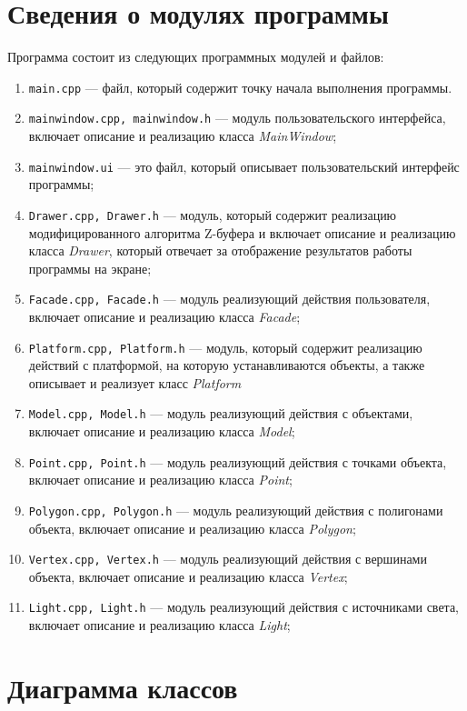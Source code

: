 \section{Сведения о модулях программы}
Программа состоит из следующих программных модулей и файлов:
\begin{enumerate}
	\item \texttt{main.cpp} --- файл, который содержит точку начала выполнения программы.
	\item \texttt{mainwindow.cpp, mainwindow.h} --- модуль пользовательского интерфейса, включает описание и реализацию класса \textit{MainWindow};
	\item \texttt{mainwindow.ui} --- это файл, который описывает пользовательский интерфейс программы;
	\item \texttt{Drawer.cpp, Drawer.h} --- модуль, который содержит реализацию модифицированного алгоритма Z-буфера и включает описание и реализацию класса \textit{Drawer}, который отвечает за отображение результатов работы программы на экране;
	\item \texttt{Facade.cpp, Facade.h} --- модуль реализующий действия пользователя, включает описание и реализацию класса \textit{Facade};
	\item \texttt{Platform.cpp, Platform.h} --- модуль, который содержит реализацию действий с платформой, на которую устанавливаются объекты, а также описывает и реализует класс \textit{Platform}
	\item \texttt{Model.cpp, Model.h} --- модуль реализующий действия с объектами, включает описание и реализацию класса \textit{Model};
	\item \texttt{Point.cpp, Point.h} --- модуль реализующий действия с точками объекта, включает описание и реализацию класса \textit{Point};
	\item \texttt{Polygon.cpp, Polygon.h} --- модуль реализующий действия с полигонами объекта, включает описание и реализацию класса \textit{Polygon};
	\item \texttt{Vertex.cpp, Vertex.h} --- модуль реализующий действия с вершинами объекта, включает описание и реализацию класса \textit{Vertex};
	\item \texttt{Light.cpp, Light.h} --- модуль реализующий действия с источниками света, включает описание и реализацию класса \textit{Light};
\end{enumerate}


\section{Диаграмма классов}

